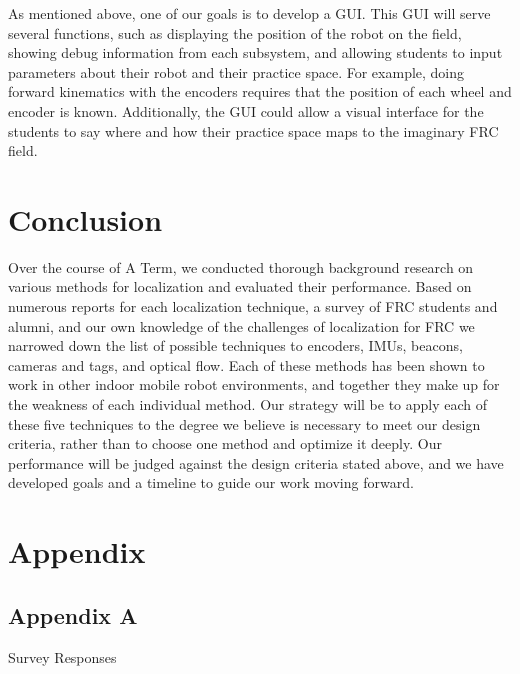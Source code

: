 \documentclass{article}
\begin{document}
      As mentioned above, one of our goals is to develop a GUI. This GUI will serve several functions, such as displaying the position of the robot on the field, showing debug information from each subsystem, and allowing students to input parameters about their robot and their practice space. For example, doing forward kinematics with the encoders requires that the position of each wheel and encoder is known. Additionally, the GUI could allow a visual interface for the students to say where and how their practice space maps to the imaginary FRC field.

\section{Conclusion} \label{conclusion}

  Over the course of A Term, we conducted thorough background research on various methods for localization and evaluated their performance. Based on numerous reports for each localization technique, a survey of FRC students and alumni, and our own knowledge of the challenges of localization for FRC we narrowed down the list of possible techniques to encoders, IMUs, beacons, cameras and tags, and optical flow. Each of these methods has been shown to work in other indoor mobile robot environments, and together they make up for the weakness of each individual method. Our strategy will be to apply each of these five techniques to the degree we believe is necessary to meet our design criteria, rather than to choose one method and optimize it deeply. Our performance will be judged against the design criteria stated above, and we have developed goals and a timeline to guide our work moving forward.

\section{Appendix}

  \subsection{Appendix A}\label{appendix:survey}

    Survey Responses
\end{document}
